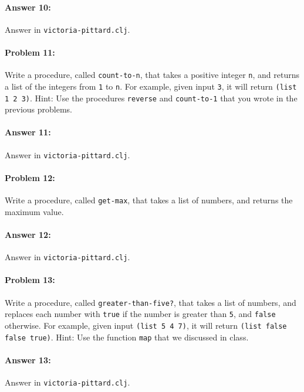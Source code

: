 \documentclass[10pt]{article}
\begin{document}
\paragraph{Answer 10:} Answer in \texttt{victoria-pittard.clj}.

\hrulefill
\paragraph{Problem 11:}
  Write a procedure, called \texttt{count-to-n}, that takes a positive
  integer \texttt{n}, and returns a list of the integers from
  \texttt{1} to \texttt{n}. For example, given input \texttt{3}, it
  will return \texttt{(list 1 2 3)}. Hint: Use the procedures
  \texttt{reverse} and \texttt{count-to-1} that you wrote in the
  previous problems.

\paragraph{Answer 11:} Answer in \texttt{victoria-pittard.clj}.

\hrulefill
\paragraph{Problem 12:}
  Write a procedure, called \texttt{get-max}, that takes a list of numbers, and
  returns the maximum value.

\paragraph{Answer 12:} Answer in \texttt{victoria-pittard.clj}.

\hrulefill
\paragraph{Problem 13:}
  Write a procedure, called \texttt{greater-than-five?}, that takes a
  list of numbers, and replaces each number with \texttt{true} if the
  number is greater than \texttt{5}, and \texttt{false} otherwise. For
  example, given input \texttt{(list 5 4 7)}, it will return
  \texttt{(list false false true)}. Hint: Use the function
  \texttt{map} that we discussed in class.

\paragraph{Answer 13:} Answer in \texttt{victoria-pittard.clj}.
\end{document}
